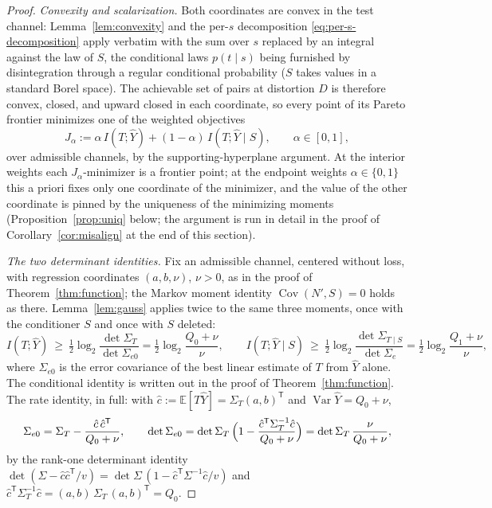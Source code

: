 ﻿\documentclass[11pt,onecolumn]{IEEEtran}
\newcommand{\E}{\mathbb{E}}
\newcommand{\Cov}{\operatorname{Cov}}
\newcommand{\hY}{\widehat{Y}}
\begin{document}
\begin{proof}
\emph{Convexity and scalarization.} Both coordinates are convex in the
test channel: Lemma~\ref{lem:convexity} and the per-$s$ decomposition
\eqref{eq:per-s-decomposition} apply verbatim with the sum over $s$
replaced by an integral against the law of $S$, the conditional laws
$p(t\mid s)$ being furnished by disintegration through a regular
conditional probability ($S$ takes values in a standard Borel space).
The achievable set of pairs at distortion $D$ is therefore convex,
closed, and upward closed in each coordinate, so every point of its
Pareto frontier minimizes one of the weighted objectives
\[
J_\alpha:=\alpha\,I(T;\hY)+(1-\alpha)\,I(T;\hY\mid S),
\qquad\alpha\in[0,1],
\]
over admissible channels, by the supporting-hyperplane argument. At
the interior weights each $J_\alpha$-minimizer is a frontier point;
at the endpoint weights $\alpha\in\{0,1\}$ this a priori fixes only
one coordinate of the minimizer, and the value of the other
coordinate is pinned by the uniqueness of the minimizing moments
(Proposition~\ref{prop:uniq} below; the argument is run in detail in
the proof of Corollary~\ref{cor:misalign} at the end of this section).

\emph{The two determinant identities.} Fix an admissible channel,
centered without loss, with regression coordinates $(a,b,\nu)$, $\nu>0$,
as in the proof of Theorem~\ref{thm:function}; the Markov moment
identity $\Cov(N',S)=0$ holds as there. Lemma~\ref{lem:gauss} applies
twice to the same three moments, once with the conditioner $S$ and once
with $S$ deleted:
\begin{equation}
I(T;\hY)\ \ge\
\tfrac12\log_2\frac{\det\Sigma_T}{\det\Sigma_{e0}}
=\tfrac12\log_2\frac{Q_0+\nu}{\nu},
\qquad
I(T;\hY\mid S)\ \ge\
\tfrac12\log_2\frac{\det\Sigma_{T\mid S}}{\det\Sigma_{e}}
=\tfrac12\log_2\frac{Q_1+\nu}{\nu},
\label{eq:two-detids}
\end{equation}
where $\Sigma_{e0}$ is the error covariance of the best linear
estimate of $T$ from $\hY$ alone. The conditional identity is written
out in the proof of Theorem~\ref{thm:function}. The rate identity, in
full: with $\hat c:=\E[T\hY]=\Sigma_T(a,b)^{\mathsf T}$ and
$\operatorname{Var}\hY=Q_0+\nu$,
\[
\Sigma_{e0}=\Sigma_T-\frac{\hat c\,\hat c^{\mathsf T}}{Q_0+\nu},
\qquad
\det\Sigma_{e0}
=\det\Sigma_T\,
\Bigl(1-\frac{\hat c^{\mathsf T}\Sigma_T^{-1}\hat c}{Q_0+\nu}\Bigr)
=\det\Sigma_T\,\frac{\nu}{Q_0+\nu},
\]
by the rank-one determinant identity
$\det(\Sigma-\hat c\hat c^{\mathsf T}/v)
=\det\Sigma\,(1-\hat c^{\mathsf T}\Sigma^{-1}\hat c/v)$ and
$\hat c^{\mathsf T}\Sigma_T^{-1}\hat c
=(a,b)\,\Sigma_T\,(a,b)^{\mathsf T}=Q_0$.


\end{proof}
\end{document}
